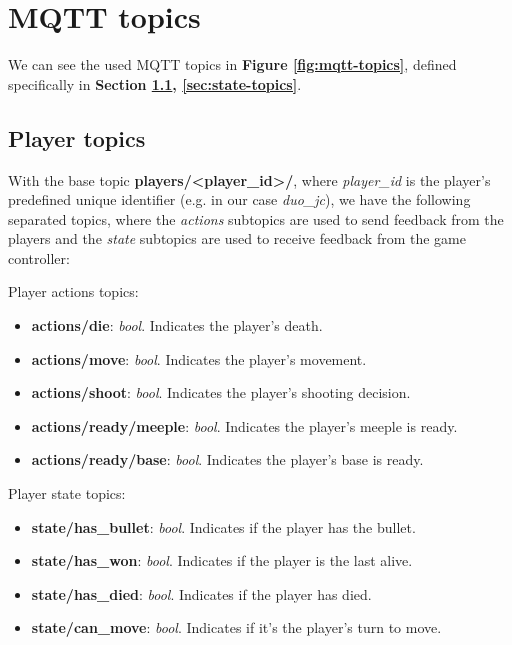\documentclass[../main.tex]{subfiles}
\begin{document}
\section{MQTT topics}

We can see the used MQTT topics in \textbf{Figure \ref{fig:mqtt-topics}}, defined specifically in \textbf{Section \ref{sec:player-topics}, \ref{sec:state-topics}}.

\subsection{Player topics}
\label{sec:player-topics}

With the base topic \textbf{players/<player\_id>/}, where \textit{player\_id} is the player's predefined unique identifier (e.g. in our case \textit{duo\_jc}), we have the following separated topics, where the \textit{actions} subtopics are used to send feedback from the players and the \textit{state} subtopics are used to receive feedback from the game controller:

Player actions topics:
\begin{itemize}
    \item \textbf{actions/die}: \textit{bool}. Indicates the player's death.
    \item \textbf{actions/move}: \textit{bool}. Indicates the player's movement.
    \item \textbf{actions/shoot}: \textit{bool}. Indicates the player's shooting decision.
    \item \textbf{actions/ready/meeple}: \textit{bool}. Indicates the player's meeple is ready.
    \item \textbf{actions/ready/base}: \textit{bool}. Indicates the player's base is ready.
\end{itemize}

Player state topics:
\begin{itemize}
    \item \textbf{state/has\_bullet}: \textit{bool}. Indicates if the player has the bullet.
    \item \textbf{state/has\_won}: \textit{bool}. Indicates if the player is the last alive.
    \item \textbf{state/has\_died}: \textit{bool}. Indicates if the player has died.
    \item \textbf{state/can\_move}: \textit{bool}. Indicates if it's the player's turn to move.
\end{itemize}
\end{document}
